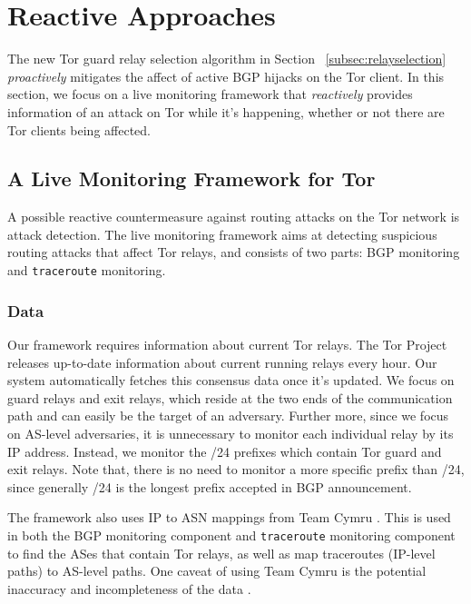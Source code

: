 \section{Reactive Approaches}
The new Tor guard relay selection algorithm in Section ~\ref{subsec:relayselection} \emph{proactively} mitigates the affect of active BGP hijacks on the Tor client. In this section, we focus on a live monitoring framework that \emph{reactively} provides information of an attack on Tor while it's happening, whether or not there are Tor clients being affected. 

\subsection{A Live Monitoring Framework for Tor}
A possible reactive countermeasure against routing attacks on the Tor network is attack 
detection.  The live monitoring framework aims at detecting suspicious routing attacks that affect Tor relays, and consists of two parts: BGP monitoring and {\tt traceroute} monitoring.\\

\subsubsection{Data} 
\label{sec:data}
Our framework requires information about current Tor relays.  The Tor Project releases up-to-date information about current running relays every hour. Our system automatically fetches this consensus data once it's updated. We focus on guard relays and exit relays, which reside at the two ends of the communication path and can easily be the target of an adversary. Further more, since we focus on AS-level adversaries, it is unnecessary to monitor each individual relay by its IP address. Instead, we monitor the /24 prefixes which contain Tor guard and exit relays. Note that, there is no need to monitor a more specific prefix than /24, since generally /24 is the longest prefix accepted in BGP announcement.

The framework also uses IP to ASN mappings from Team Cymru \cite{teamcymru}.  This is used in both the BGP monitoring component and {\tt traceroute} monitoring component to find the ASes that contain Tor relays, as well as map traceroutes (IP-level paths) to AS-level paths.  One caveat of using Team Cymru is the potential inaccuracy and incompleteness of the data .

